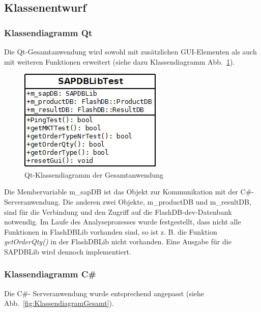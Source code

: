\subsection{Klassenentwurf}
\subsubsection{Klassendiagramm Qt}
Die Qt-Gesamtanwendung wird sowohl mit zusätzlichen GUI-Elementen als auch mit weiteren Funktionen erweitert (siehe dazu Klassendiagramm \mbox{Abb. \ref{fig:KlassendiagrammQt})}.

\begin{figure}[H]
	\centering
	\includegraphics[width=0.5\linewidth]{images/KlassendiagrammQt}
	\caption[Qt-Klassendiagramm der Gesamtanwendung]{Qt-Klassendiagramm der Gesamtanwendung}
	\label{fig:KlassendiagrammQt}
\end{figure}
Die Membervariable m\_sapDB ist das Objekt zur Kommunikation mit der C\#-Serveranwendung. Die anderen zwei Objekte, m\_productDB und m\_resultDB, sind für die Verbindung und den Zugriff auf die FlashDB-dev-Datenbank notwendig.
Im Laufe des Analyseprozesses wurde festgestellt, dass nicht alle Funktionen in FlashDBLib vorhanden sind, so ist z. B. die Funktion \textit{getOrderQty()} in der FlashDBLib nicht vorhanden. Eine Ausgabe für die SAPDBLib wird dennoch implementiert.  
\subsubsection{Klassendiagramm C\#}
Die C\#- Serveranwendung wurde entsprechend angepasst (siehe \mbox{Abb.  \ref{fig:KlassendiagramGesamt}}).

